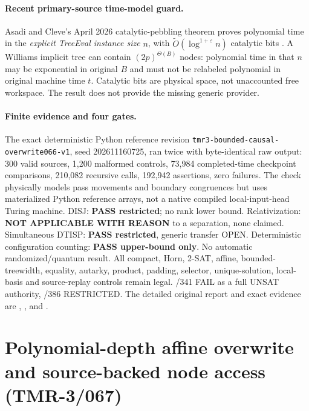 \documentclass[11pt]{article}
\begin{document}
\paragraph{Recent primary-source time-model guard.}
Asadi and Cleve's April 2026 catalytic-pebbling theorem proves
polynomial time in the \emph{explicit TreeEval instance size} $n$,
with $\widetilde O(\log^{1+\varepsilon}n)$ catalytic bits
\cite{AsadiCleve2026}. A Williams implicit tree can contain
$(2p)^{\Theta(B)}$ nodes: polynomial time in that $n$ may be
exponential in original $B$ and must not be relabeled polynomial in
original machine time $t$. Catalytic bits are physical space, not
unaccounted free workspace. The result does not provide the missing
generic provider.

\paragraph{Finite evidence and four gates.}
The exact deterministic Python reference revision
\texttt{tmr3-bounded-causal-overwrite066-v1}, seed 202611160725,
ran twice with byte-identical raw output: 300 valid sources,
1,200 malformed controls, 73,984 completed-time checkpoint comparisons,
210,082 recursive calls, 192,942 assertions, zero failures.
The check physically models pass movements and boundary congruences
but uses materialized Python reference arrays, not a native
compiled local-input-head Turing machine.
DISJ: \textbf{PASS restricted}; no rank lower bound.
Relativization: \textbf{NOT APPLICABLE WITH REASON}
to a separation, none claimed.
Simultaneous DTISP: \textbf{PASS restricted}, generic transfer OPEN.
Deterministic configuration counting: \textbf{PASS upper-bound only}.
No automatic randomized/quantum result. All compact, Horn, 2-SAT,
affine, bounded-treewidth, equality, autarky, product, padding,
selector, unique-solution, local-basis and source-replay controls
remain legal. /341 FAIL as a full UNSAT authority, /386 RESTRICTED.
The detailed original report and exact evidence are
,
, and
.

\section{Polynomial-depth affine overwrite and source-backed node access (TMR-3/067)}
\end{document}
